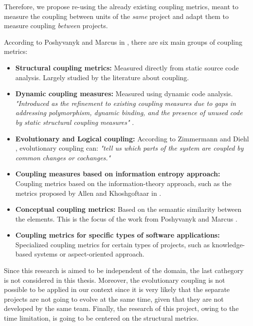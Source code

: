 Therefore, we propose re-using the already existing coupling metrics, meant to measure the coupling between units of the \textit{same} project and adapt them to measure coupling \textit{between} projects.

\blankl
According to Poshyvanyk and Marcus in \cite{poshyvanyk2006conceptual}, there are six main groups of coupling metrics:

\begin{itemize}
  \item \textbf{Structural coupling metrics:} Measured directly from static source code analysis. Largely studied by the literature about coupling.

  \item \textbf{Dynamic coupling measures:} Measured using dynamic code analysis. \textit{"Introduced as the refinement to existing coupling measures due to gaps in addressing polymorphism, dynamic binding, and the presence of unused code by static structural coupling measures"} \cite{poshyvanyk2006conceptual}.

  \item \textbf{Evolutionary and Logical coupling:} According to Zimmermann and Diehl \cite{zimmermann2005mining}, evolutionary coupling can: \textit{"tell us which parts of the system are coupled by common changes or cochanges."}

  \item \textbf{Coupling measures based on information entropy approach:} Coupling metrics based on the information-theory approach, such as the metrics proposed by Allen and Khoshgoftaar in \cite{allen1999measuring}.

  \item \textbf{Conceptual coupling metrics:} Based on the semantic similarity between the elements. This is the focus of the work from Poshyvanyk and Marcus \cite{poshyvanyk2006conceptual}.

  \item \textbf{Coupling metrics for specific types of software applications:} Specialized coupling metrics for certain types of projects, such as knowledge-based systems or aspect-oriented approach.
\end{itemize}

\blankl
Since this research is aimed to be independent of the domain, the last cathegory is not considered in this thesis. Moreover, the evolutionary coupling is not possible to be applied in our context since it is very likely that the separate projects are not going to evolve at the same time, given that they are not developed by the same team. Finally, the research of this project, owing to the time limitation, is going to be centered on the structural metrics.

